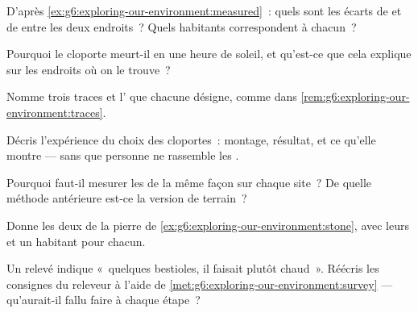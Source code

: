 \begin{exercise}[$\star$]\label{exo:g6:exploring-our-environment:4}
D'après \cref{ex:g6:exploring-our-environment:measured}~: quels sont
les écarts de  et de  entre les deux endroits~?
Quels habitants correspondent à chacun~?
\end{exercise}

\begin{exercise}[$\star$]\label{exo:g6:exploring-our-environment:5}
Pourquoi le cloporte meurt-il en une heure de soleil, et
qu'est-ce que cela explique sur les endroits où on le trouve~?
\end{exercise}

\begin{exercise}[$\star$]\label{exo:g6:exploring-our-environment:6}
Nomme trois traces et l' que chacune désigne, comme dans
\cref{rem:g6:exploring-our-environment:traces}.
\end{exercise}

\begin{exercise}[$\star\star$]\label{exo:g6:exploring-our-environment:7}
Décris l'expérience du choix des cloportes~: montage, résultat, et
ce qu'elle montre --- sans que personne ne rassemble les .
\end{exercise}

\begin{exercise}[$\star\star$]\label{exo:g6:exploring-our-environment:8}
Pourquoi faut-il mesurer les  de la même façon sur chaque
site~? De quelle méthode antérieure est-ce la version de terrain~?
\end{exercise}

\begin{exercise}[$\star\star$]\label{exo:g6:exploring-our-environment:9}
Donne les deux  de la pierre de
\cref{ex:g6:exploring-our-environment:stone}, avec leurs 
et un habitant pour chacun.
\end{exercise}

\begin{exercise}[$\star\star$]\label{exo:g6:exploring-our-environment:10}
Un relevé indique «~quelques bestioles, il faisait plutôt chaud~».
Réécris les consignes du releveur à l'aide de
\cref{met:g6:exploring-our-environment:survey} --- qu'aurait-il
fallu faire à chaque étape~?
\end{exercise}

